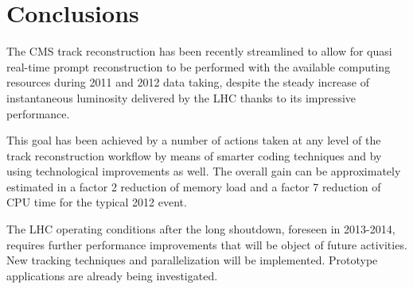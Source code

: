 \section{Conclusions}
\label{conclusions}

The CMS track reconstruction has been recently streamlined to allow
for quasi real-time prompt reconstruction to be performed with the
available computing resources during 2011 and 2012 data taking,
despite the steady increase of instantaneous luminosity delivered by
the LHC thanks to its impressive performance.

This goal has been achieved by a number of actions taken at any level
of the track reconstruction workflow by means of smarter coding
techniques and by using technological improvements as well. The
overall gain can be approximately estimated in a factor 2 
reduction of memory load and a factor 7 reduction of CPU time for the
typical 2012 event.

The LHC operating conditions after the long shoutdown, foreseen in
2013-2014, requires further performance improvements that will be
object of future activities. New tracking techniques and
parallelization will be implemented. Prototype applications are
already being investigated.
